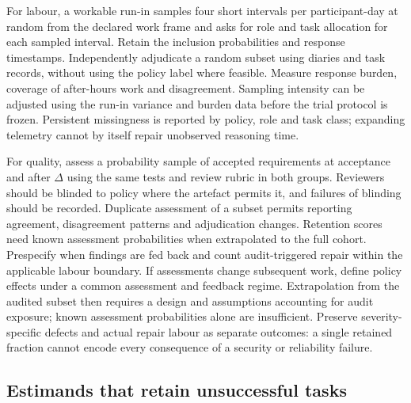 \documentclass[11pt,a4paper]{amsart}
\theoremstyle{definition}
\theoremstyle{remark}
\begin{document}
For labour, a workable run-in samples four short intervals per participant-day at random from the declared work frame and asks for role and task allocation for each sampled interval. Retain the inclusion probabilities and response timestamps. Independently adjudicate a random subset using diaries and task records, without using the policy label where feasible. Measure response burden, coverage of after-hours work and disagreement. Sampling intensity can be adjusted using the run-in variance and burden data before the trial protocol is frozen. Persistent missingness is reported by policy, role and task class; expanding telemetry cannot by itself repair unobserved reasoning time.

For quality, assess a probability sample of accepted requirements at acceptance and after $\Delta$ using the same tests and review rubric in both groups. Reviewers should be blinded to policy where the artefact permits it, and failures of blinding should be recorded. Duplicate assessment of a subset permits reporting agreement, disagreement patterns and adjudication changes. Retention scores need known assessment probabilities when extrapolated to the full cohort. Prespecify when findings are fed back and count audit-triggered repair within the applicable labour boundary. If assessments change subsequent work, define policy effects under a common assessment and feedback regime. Extrapolation from the audited subset then requires a design and assumptions accounting for audit exposure; known assessment probabilities alone are insufficient. Preserve severity-specific defects and actual repair labour as separate outcomes: a single retained fraction cannot encode every consequence of a security or reliability failure.

\subsection{Estimands that retain unsuccessful tasks}
\end{document}
